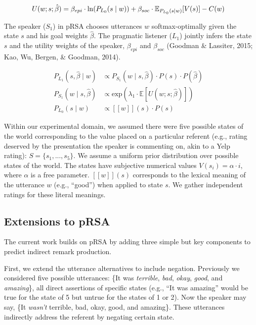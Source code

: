 \documentclass[10pt, letterpaper]{article}
\begin{document}
\[U(w;s;  \hat{\beta}) = \beta_{epi}\cdot \ln(P_{L_0}(s \mid w)) 
\\+ \beta_{soc} \cdot \mathbb{E}_{P_{L_0}(s \mid w)}[V(s)]- C(w)\]

The speaker (\(S_1\)) in pRSA chooses utterances \(w\) softmax-optimally
given the state \(s\) and his goal weights \(\hat{\beta}\). The
pragmatic listener (\(L_1\)) jointly infers the state \(s\) and the
utility weights of the speaker, \(\beta_{epi}\) and \(\beta_{soc}\)
(Goodman \& Lassiter, 2015; Kao, Wu, Bergen, \& Goodman, 2014).

\begin{align}
P_{L_1}(s, \hat{\beta} \mid w) &\propto P_{S_1}(w \mid s, \hat{\beta})\cdot P(s) \cdot P( \hat{\beta}) \label{eq:L1}\\
P_{S_1}(w \mid s, \hat{\beta}) &\propto \mathrm{exp}(\lambda_{1} \cdot \mathbb{E}[U(w; s;  \hat{\beta})]) \label{eq:S1}\\
P_{L_0}(s \mid w) &\propto [[w]](s) \cdot P(s) \label{eq:L0}
\end{align}

Within our experimental domain, we assumed there were five possible
states of the world corresponding to the value placed on a particular
referent (e.g., rating deserved by the presentation the speaker is
commenting on, akin to a Yelp rating): \(S = \{s_{1}, ..., s_{5}\}\). We
assume a uniform prior distribution over possible states of the world.
The states have subjective numerical values
\(V(s_{i}) = \alpha \cdot i\), where \(\alpha\) is a free parameter.
\([[w]](s)\) corresponds to the lexical meaning of the utterance \(w\)
(e.g., ``good'') when applied to state \(s\). We gather independent
ratings for these literal meanings.

\subsection{Extensions to pRSA}\label{extensions-to-prsa}

The current work builds on pRSA by adding three simple but key
components to predict indirect remark production.

First, we extend the utterance alternatives to include negation.
Previously we considered five possible utterances: \{It was
\emph{terrible}, \emph{bad}, \emph{okay}, \emph{good}, and
\emph{amazing}\}, all direct assertions of specific states (e.g., ``It
was amazing'' would be true for the state of 5 but untrue for the states
of 1 or 2). Now the speaker may say, \{It \emph{wasn't} terrible, bad,
okay, good, and amazing\}. These utterances indirectly address the
referent by negating certain state.
\end{document}
